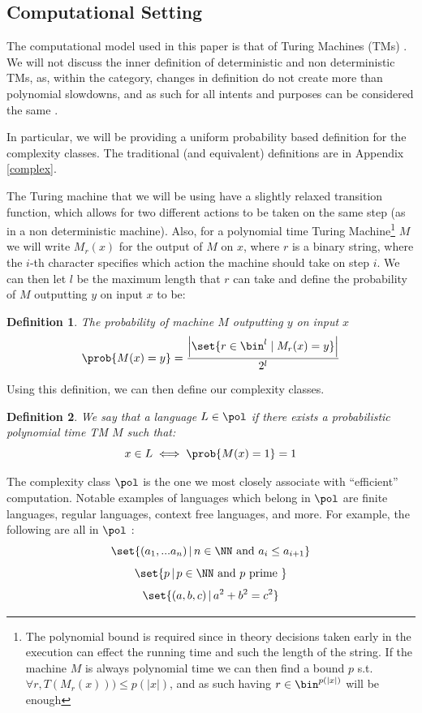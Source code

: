 \documentclass{article}
\newtheorem{definition}{Definition}
\begin{document}
\subsection{Computational Setting}
The computational model used in this paper is that of Turing Machines (TMs) \cite{turingComputableNumbersApplication1937}. We will not discuss the inner definition of deterministic and non deterministic TMs, as, within the category, changes in definition do not create more than polynomial slowdowns, and as such for all intents and purposes can be considered the same \cite{aroraComputationalComplexityModern2009}.

In particular, we will be providing a uniform probability based definition for the complexity classes. The traditional (and equivalent) definitions are in Appendix \ref{complex}.

The Turing machine that we will be using have a slightly relaxed transition function, which allows for two different actions to be taken on the same step (as in a non deterministic machine). Also, for a polynomial time Turing Machine\footnote{The polynomial bound is required since in theory decisions taken early in the execution can effect the running time and such the length of the string. If the machine $M$ is always polynomial time we can then find a bound $p$ s.t. $\forall r, T(M_r(x))) \leq p(|x|) $, and as such having $r \in \bin^{p(|x|)}$ will be enough} $M$ we will write $M_r(x)$ for the output of $M$ on $x$, where $r$ is a binary string, where the $i$-th character specifies which action the machine should take on step $i$. We can then let $l$ be the maximum length that $r$ can take and define the probability of $M$ outputting $y$ on input $x$ to be:

\begin{definition} The probability of machine $M$ outputting $y$ on input $x$
    \[ \prob{M(x) = y} = \frac{\left|\set{r \in \bin^{l} \mid M_r(x) = y }\right|}{2^{l}}\]
\end{definition}

Using this definition, we can then define our complexity classes.

\begin{definition}
    We say that a language $L \in \pol$ if there exists a probabilistic polynomial time TM $M$ such that:
    \[x \in L \iff \prob{M(x) = 1} = 1\]
\end{definition}

The complexity class $\pol$ is the one we most closely associate with \enquote{efficient} computation. Notable examples of languages which belong in $\pol$ are finite languages, regular languages, context free languages, and more. For example, the following are all in $\pol$ :
\[ \set{(a_1, ... a_n) \, | \, n \in \NN \text{ and } a_i \leq a_{i+1} }\]
\[ \set{ p \,|\, p \in \NN \text{ and } p \text{ prime } }\]
\[ \set{ (a, b, c) \, | \, a^2 + b^2 = c^2 } \]
\end{document}
